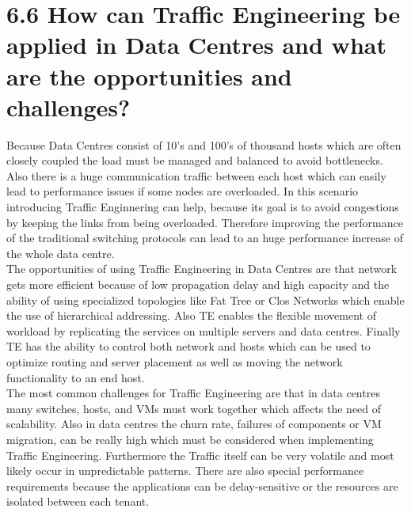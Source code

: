 \documentclass{article}
\begin{document}
	\section*{6.6 How can Traffic Engineering be applied in Data Centres and what are the opportunities and challenges?}
	\begin{adjustwidth}{2em}{2em}
		Because Data Centres consist of 10's and 100's of thousand hosts which are often closely coupled the load must be managed and balanced to avoid bottlenecks. Also there is a huge communication traffic between each host which can easily lead to performance issues if some nodes are overloaded. In this scenario introducing Traffic Enginnering can help, because its goal is to avoid congestions by keeping the links from being overloaded. Therefore improving the performance of the traditional switching protocols can lead to an huge performance increase of the whole data centre. \\ 
		The opportunities of using Traffic Engineering in Data Centres are that network gets more efficient because of low propagation delay and high capacity and the ability of using specialized topologies like Fat Tree or Clos Networks which enable the use of hierarchical addressing. Also TE enables the flexible movement of workload by replicating the services on multiple servers and data centres. Finally TE has the ability to control both network and hosts which can be used to optimize routing and server placement as well as moving the network functionality to an end host. \\
		The most common challenges for Traffic Engineering are that in data centres many switches, hosts, and VMs must work together which affects the need of scalability. Also in data centres the churn rate, failures of components or VM migration, can be really high which must be considered when implementing Traffic Engineering. Furthermore the Traffic itself can be very volatile and most likely occur in unpredictable patterns. There are also special performance requirements because the applications can be delay-sensitive or the resources are isolated between each tenant.
		\end{adjustwidth}
\end{document}
